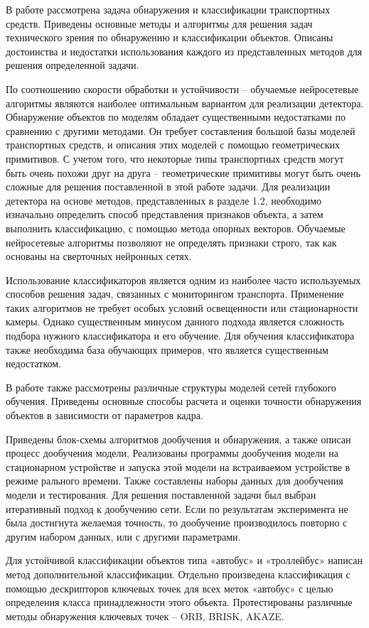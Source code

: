 \conclusion

В работе рассмотрена задача обнаружения и классификации транспортных средств. Приведены основные методы и алгоритмы для решения задач технического зрения по обнаружению и классификации объектов. Описаны достоинства и недостатки использования каждого из представленных методов для решения определенной задачи. 

По соотношению скорости обработки и устойчивости – обучаемые нейросетевые алгоритмы являются наиболее оптимальным вариантом для реализации детектора. Обнаружение объектов по моделям обладает существенными недостатками по сравнению с другими методами. Он требует составления большой базы моделей транспортных средств, и описания этих моделей с помощью геометрических примитивов. С учетом того, что некоторые типы транспортных средств могут быть очень похожи друг на друга – геометрические примитивы могут быть очень сложные для решения поставленной в этой работе задачи. Для реализации детектора на основе методов, представленных в разделе 1.2, необходимо изначально определить способ представления признаков объекта, а затем выполнить классификацию, с помощью метода опорных векторов. Обучаемые нейросетевые алгоритмы позволяют не определять признаки строго, так как основаны на сверточных нейронных сетях.

Использование классификаторов является одним из наиболее часто используемых способов решения задач, связанных с мониторингом транспорта. Применение таких алгоритмов не требует особых условий освещенности или стационарности камеры. Однако существенным минусом данного подхода является сложность подбора нужного классификатора и его обучение. Для обучения классификатора также необходима база обучающих примеров, что является существенным недостатком.

В работе также рассмотрены различные структуры моделей сетей глубокого обучения. Приведены основные способы расчета и оценки точности обнаружения объектов в зависимости от параметров кадра. 

Приведены блок-схемы алгоритмов дообучения и обнаружения, а также описан процесс дообучения модели, Реализованы программы дообучения модели на стационарном устройстве и запуска этой модели на встраиваемом устройстве в режиме рального времени. Также составлены наборы данных для дообучения модели и тестирования. Для решения поставленной задачи был выбран итеративный подход к дообучению сети. Если по результатам эксперимента не была достигнута желаемая точность, то дообучение производилось повторно с другим набором данных, или с другими параметрами. 

Для устойчивой классификации объектов типа «автобус» и «троллейбус» написан метод дополнительной классификации. Отдельно произведена классификация с помощью дескрипторов ключевых точек для всех меток «автобус» с целью определения класса принадлежности этого объекта. Протестированы различные методы обнаружения ключевых точек – ORB, BRISK, AKAZE.


